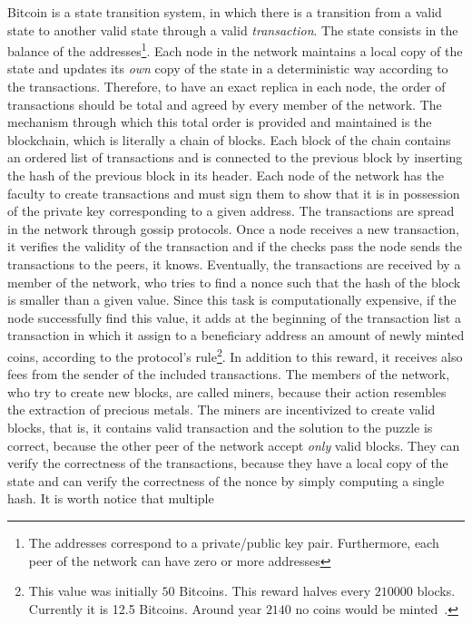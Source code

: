 Bitcoin is a state transition system, in which there is a transition from
a valid state to another valid state through a valid \emph{transaction}. The
state consists in the balance of the addresses\footnote{The addresses 
correspond to a private/public key pair. Furthermore, each peer of the 
network can have zero or more addresses}. Each node in the network maintains a
local copy of the state and updates its \emph{own} copy of the state in a 
deterministic way according to the transactions. Therefore, to have an exact 
replica in each node, the order of transactions should be total and agreed by 
every member of the network. The mechanism through which this total order is
provided and maintained is the blockchain, which is literally a chain of
blocks. Each block of the chain contains an ordered list of transactions and is 
connected to the previous block by inserting the hash of the previous block in 
its header. Each node of the network has the faculty to create transactions and
must sign them to show that it is in possession of the private key corresponding
to a given address. The transactions are spread in the network through
gossip protocols. Once a node receives a new transaction, it verifies 
the validity of the transaction and if the checks pass the node sends the 
transactions to the peers, it knows. Eventually, the transactions are received
by a member of the network, who tries to find a nonce such that the hash of the 
block is smaller than a given value. Since this task is computationally 
expensive, if the node successfully find this value, it adds at the beginning 
of the transaction list a transaction in which it assign to a beneficiary 
address an amount of newly minted coins, according to the protocol's 
rule\footnote{This value was initially $50$ Bitcoins. This reward halves every 
$210000$ blocks. Currently it is 12.5 Bitcoins. Around year $2140$ no coins 
would be minted~\cite{bib:masteringbitcoin}.}. In addition to this reward, it 
receives also fees from the sender of the included transactions. The members of
the network, who try to create new blocks, are called miners, because their 
action resembles the extraction of precious metals. The miners are incentivized 
to create valid blocks, that is, it contains valid transaction and the solution 
to the puzzle  is correct, because the other peer of the network accept 
\emph{only} valid blocks. They can verify the correctness of the transactions, 
because they have a local copy of the state and can verify the correctness of 
the nonce by simply computing a single hash. It is worth notice that multiple
